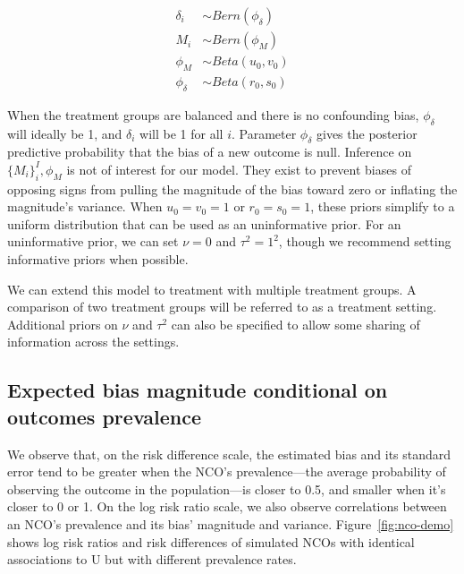 \begin{align}
    \delta_i &\sim Bern(\phi_\delta)\\
    M_i &\sim Bern(\phi_M)\\
    \phi_M &\sim Beta(u_0, v_0) \\
    \phi_\delta &\sim Beta(r_0, s_0)
\end{align}

When the treatment groups are balanced and there is no confounding bias, $\phi_\delta$ will ideally be 1, and $\delta_i$ will be 1 for all $i$. Parameter $\phi_\delta$ gives the posterior predictive probability that the bias of a new outcome is null. Inference on $\{M_i\}_i^I, \phi_M$ is not of interest for our model. They exist to prevent biases of opposing signs from pulling the magnitude of the bias toward zero or inflating the magnitude's variance. When $u_0=v_0=1$ or $r_0=s_0=1$, these priors simplify to a uniform distribution that can be used as an uninformative prior. For an uninformative prior, we can set $\nu=0$ and $\tau^2=1^2$, though we recommend setting informative priors when possible.

We can extend this model to treatment with multiple treatment groups. A comparison of two treatment groups will be referred to as a treatment setting. Additional priors on $\nu$ and $\tau^2$ can also be specified to allow some sharing of information across the settings.

\subsection{Expected bias magnitude conditional on outcomes prevalence}

We observe that, on the risk difference scale, the estimated bias and its standard error tend to be greater when the NCO's prevalence---the average probability of observing the outcome in the population---is closer to 0.5, and smaller when it's closer to 0 or 1. On the log risk ratio scale, we also observe correlations between an NCO's prevalence and its bias' magnitude and variance. Figure~\ref{fig:nco-demo} shows log risk ratios and risk differences of simulated NCOs with identical associations to U but with different prevalence rates.

